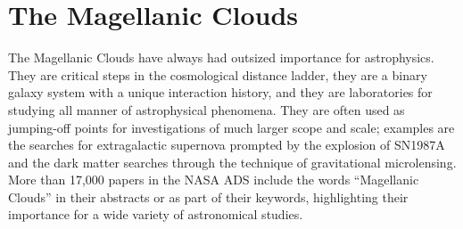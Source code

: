 %
%
%
%
%
%

\section{ The Magellanic Clouds }
\def\secname{MCs}\label{sec:\secname}



The Magellanic Clouds have always had outsized importance for astrophysics.  They are critical steps in the cosmological distance ladder, they are a binary galaxy system with a unique interaction history, and they are laboratories for studying all manner of astrophysical phenomena.  They are often used as jumping-off points for investigations of much larger scope and scale; examples are the searches for extragalactic supernova prompted by the explosion of SN1987A and the dark matter searches through the technique of gravitational microlensing.  More than 17,000 papers in the NASA ADS include the words ``Magellanic Clouds'' in their abstracts or as part of their keywords, highlighting their importance for a wide variety of astronomical studies.

